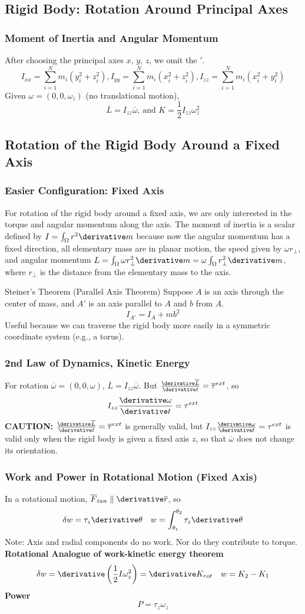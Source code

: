 \subsection{Rigid Body: Rotation Around Principal Axes}
\begin{frame}
\frametitle{Moment of Inertia and Angular Momentum}
After choosing the \alert{principal axes} $x$, $y$, $z$, we omit the $'$.
\[I_{xx}=\sum_{i=1}^{N}m_i(y_i^2+z_i^2),I_{yy}=\sum_{i=1}^{N}m_i(x_i^2+z_i^2),I_{zz}=\sum_{i=1}^{N}m_i(x_i^2+y_i^2)\]
Given $\omega=(0,0,\omega_z)$ (no translational motion), \[\overline{L}=I_{zz}\overline{\omega}\text{, and }K=\frac{1}{2}I_{zz}\omega_{z}^2\]
\end{frame}
\subsection{Rotation of the Rigid Body Around a Fixed Axis}
\begin{frame}
\frametitle{Easier Configuration: Fixed Axis}
For rotation of the rigid body around a \alert{fixed axis}, we are only interested in the torque and angular momentum \alert{along the axis}. The moment of inertia is a scalar defined by $I=\int_\Omega r^2 \derivative m$ because now the \alert{angular momentum} has a fixed direction, all elementary mass are in planar motion, the speed given by $\omega r_\perp$, and angular momentum $L=\int_\Omega \omega r_\perp^2 \derivative m=\omega\int_\Omega r_\perp^2\derivative m$, where $r_\perp$ is the distance from the elementary mass to the axis.
\begin{block}{Steiner's Theorem (Parallel Axis Theorem)}
Suppose $A$ is an axis \alert{through the center of mass}, and $A'$ is an axis \alert{parallel} to $A$ and $b$ from $A$.
\[I_{A'}=I_{A}+mb^2\]
Useful because we can \alert{traverse} the rigid body more easily in a \alert{symmetric} coordinate system (e.g., a torus).
\end{block}
\end{frame}
\begin{frame}
\frametitle{2nd Law of Dynamics, Kinetic Energy}
For rotation $\overline\omega=(0,0,\omega)$, $\overline{L}=I_{zz}\overline{\omega}$. But $\frac{\derivative\overline L}{\derivative t}=\overline\tau^{ext}$, so
\[I_{zz}\frac{\derivative\omega}{\derivative t}=\tau^{ext}\]
\textbf{CAUTION:} $\frac{\derivative \overline L}{\derivative t}=\overline\tau^{ext}$ is \alert{generally valid}, but $I_{zz}\frac{\derivative\omega}{\derivative t}=\tau^{ext}$ is valid only when the rigid body is given a \alert{fixed axis} $z$, so that $\overline\omega$ does not change its \alert{orientation}.
\end{frame}
\begin{frame}
\frametitle{Work and Power in Rotational Motion (Fixed Axis)}
In a rotational motion, $\overline F_{tan}\parallel\derivative\overline r$, so
\[\delta w=\tau_z\derivative\theta\quad w=\int_{\theta_1}^{\theta_2}\tau_z\derivative\theta\]
Note: Axis and radial components do no work. Nor do they contribute to torque.\\
\textbf{Rotational Analogue of work-kinetic energy theorem}
\[\delta w=\derivative\left(\frac{1}{2}I\omega_z^2\right)=\derivative K_{rot}\quad w=K_2-K_1\]
\textbf{Power}
\[P=\tau_z\omega_z\]
\end{frame}
